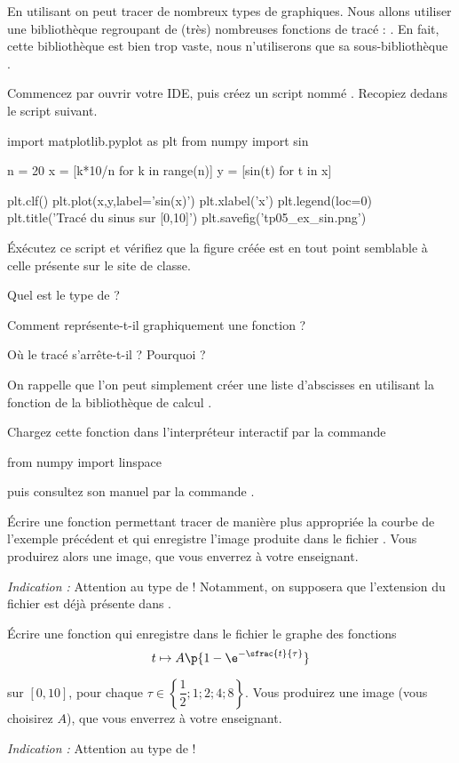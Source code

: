 En utilisant \python{} on peut tracer de nombreux types de graphiques. 
Nous allons utiliser une bibliothèque regroupant de (très) nombreuses fonctions de tracé : .
En fait, cette bibliothèque est bien trop vaste, nous n'utiliserons que sa sous-bibliothèque .

Commencez par ouvrir votre IDE, puis créez un script nommé . Recopiez dedans le script suivant. 
\begin{pyverbatim}
import matplotlib.pyplot as plt
from numpy import sin

n = 20
x = [k*10/n for k in range(n)]
y = [sin(t) for t in x]

plt.clf()
plt.plot(x,y,label='sin(x)')
plt.xlabel('x')
plt.legend(loc=0)
plt.title('Tracé du sinus sur [0,10]')
plt.savefig('tp05_ex_sin.png')
\end{pyverbatim}
\'Exécutez ce script et vérifiez que la figure créée est en tout point semblable à celle présente sur le site de classe. 

\medskip{}

\question{} Quel est le type de  ?

\medskip{}

\question{} Comment \python{} représente-t-il graphiquement une fonction ? 

\medskip{}

\question{} Où le tracé s'arrête-t-il ? Pourquoi ? 

\medskip{}

On rappelle que l'on peut simplement créer une liste d'abscisses en utilisant la fonction  de la bibliothèque de calcul . 

Chargez cette fonction dans l'interpréteur interactif par la commande 
\begin{pyverbatim}
from numpy import linspace
\end{pyverbatim}
puis consultez son manuel par la commande . 

\medskip{}

\question{}\label{tp05:qu:sin2} Écrire une fonction  permettant tracer de manière plus appropriée la courbe de l'exemple précédent et qui enregistre l'image produite dans le fichier . 
Vous produirez alors une image, que vous enverrez à votre enseignant. 

\emph{Indication :} Attention au type de  ! Notamment, on supposera que l'extension du fichier est déjà présente dans .

\medskip{}

\question{}\label{tp05:qu:transitoire} \'Ecrire une fonction  qui enregistre dans le fichier  le graphe des fonctions 
\begin{equation*}
  t\mapsto A\p{1-\e^{-\sfrac{t}{\tau}}}
\end{equation*}


sur $[0,10]$, pour chaque $\tau\in\left\{\dfrac{1}{2};1;2;4;8\right\}$. 
Vous produirez une image (vous choisirez $A$), que vous enverrez à votre enseignant. 

\emph{Indication :} Attention au type de  !